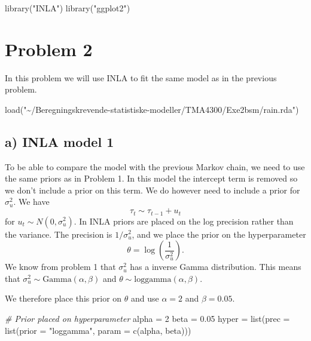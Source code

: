 \documentclass[
]{article}
\newenvironment{Shaded}{\begin{snugshade}}{\end{snugshade}}
\newcommand{\AttributeTok}[1]{\textcolor[rgb]{0.77,0.63,0.00}{#1}}
\newcommand{\CommentTok}[1]{\textcolor[rgb]{0.56,0.35,0.01}{\textit{#1}}}
\newcommand{\DecValTok}[1]{\textcolor[rgb]{0.00,0.00,0.81}{#1}}
\newcommand{\FloatTok}[1]{\textcolor[rgb]{0.00,0.00,0.81}{#1}}
\newcommand{\FunctionTok}[1]{\textcolor[rgb]{0.00,0.00,0.00}{#1}}
\newcommand{\NormalTok}[1]{#1}
\newcommand{\OtherTok}[1]{\textcolor[rgb]{0.56,0.35,0.01}{#1}}
\newcommand{\StringTok}[1]{\textcolor[rgb]{0.31,0.60,0.02}{#1}}
\begin{document}
\begin{Shaded}
\begin{Highlighting}[]
\FunctionTok{library}\NormalTok{(}\StringTok{"INLA"}\NormalTok{)}
\FunctionTok{library}\NormalTok{(}\StringTok{"ggplot2"}\NormalTok{)}
\end{Highlighting}
\end{Shaded}

\hypertarget{problem-2}{%
\section{Problem 2}\label{problem-2}}

In this problem we will use INLA to fit the same model as in the previous problem.

\begin{Shaded}
\begin{Highlighting}[]
\FunctionTok{load}\NormalTok{(}\StringTok{"\textasciitilde{}/Beregningskrevende{-}statistiske{-}modeller/TMA4300/Exe2bsm/rain.rda"}\NormalTok{)}
\end{Highlighting}
\end{Shaded}

\hypertarget{a-inla-model-1}{%
\subsection{a) INLA model 1}\label{a-inla-model-1}}

To be able to compare the model with the previous Markov chain, we need to use the same priors as in Problem 1. In this model the intercept term is removed so we don't include a prior on this term. We do however need to include a prior for \(\sigma_u^2\).
We have
\[
\tau_t \sim \tau_{t-1}+u_t
\]
for \(u_t \sim N(0, \sigma_u^2).\)
In INLA priors are placed on the log precision rather than the variance. The precision is \(1/\sigma_u^2\), and we place the prior on the hyperparameter
\[
\theta=\log \left( \frac{1}{\sigma_u^2} \right).
\]
We know from problem 1 that \(\sigma_u^2\) has a inverse Gamma distribution. This means that \(\sigma_u^2 \sim \text{Gamma}(\alpha, \beta)\) and \(\theta \sim \text{loggamma}(\alpha, \beta).\)

We therefore place this prior on \(\theta\) and use \(\alpha=2\) and \(\beta=0.05.\)

\begin{Shaded}
\begin{Highlighting}[]
\CommentTok{\# Prior placed on hyperparameter}
\NormalTok{alpha }\OtherTok{=} \DecValTok{2}
\NormalTok{beta }\OtherTok{=} \FloatTok{0.05}
\NormalTok{hyper }\OtherTok{=} \FunctionTok{list}\NormalTok{(}\AttributeTok{prec =} \FunctionTok{list}\NormalTok{(}\AttributeTok{prior =} \StringTok{"loggamma"}\NormalTok{, }\AttributeTok{param =} \FunctionTok{c}\NormalTok{(alpha, beta)))}
\end{Highlighting}
\end{Shaded}
\end{document}
